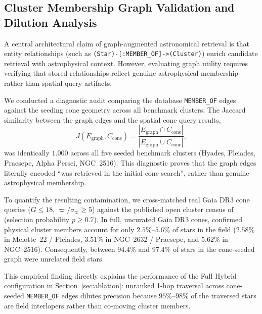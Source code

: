 \documentclass[12pt]{elsarticle}
\begin{document}
\subsection{Cluster Membership Graph Validation and Dilution Analysis}
\label{sec:membership_eval}

A central architectural claim of graph-augmented astronomical retrieval is that entity relationships (such as \texttt{(Star)-[:MEMBER\_OF]->(Cluster)}) enrich candidate retrieval with astrophysical context. However, evaluating graph utility requires verifying that stored relationships reflect genuine astrophysical membership rather than spatial query artifacts.

We conducted a diagnostic audit comparing the database \texttt{MEMBER\_OF} edges against the seeding cone geometry across all benchmark clusters. The Jaccard similarity between the graph edges and the spatial cone query results,
\begin{equation}
J(E_{\mathrm{graph}}, C_{\mathrm{cone}}) = \frac{|E_{\mathrm{graph}} \cap C_{\mathrm{cone}}|}{|E_{\mathrm{graph}} \cup C_{\mathrm{cone}}|},
\end{equation}
was identically $1.000$ across all five seeded benchmark clusters (Hyades, Pleiades, Praesepe, Alpha Persei, NGC~2516). This diagnostic proves that the graph edges literally encoded ``was retrieved in the initial cone search'', rather than genuine astrophysical membership.

To quantify the resulting contamination, we cross-matched real Gaia DR3 cone queries ($G \le 18$, $\varpi / \sigma_\varpi \ge 5$) against the published open cluster census of \citet{Hunt2023} (selection probability $p \ge 0.7$). In full, uncurated Gaia DR3 cones, confirmed physical cluster members account for only $2.5\%$--$5.6\%$ of stars in the field ($2.58\%$ in Melotte~22 / Pleiades, $3.51\%$ in NGC~2632 / Praesepe, and $5.62\%$ in NGC~2516). Consequently, between $94.4\%$ and $97.4\%$ of stars in the cone-seeded graph were unrelated field stars.

This empirical finding directly explains the performance of the Full Hybrid configuration in Section~\ref{sec:ablation}: unranked 1-hop traversal across cone-seeded \texttt{MEMBER\_OF} edges dilutes precision because $95\%$--$98\%$ of the traversed stars are field interlopers rather than co-moving cluster members.

\end{document}
